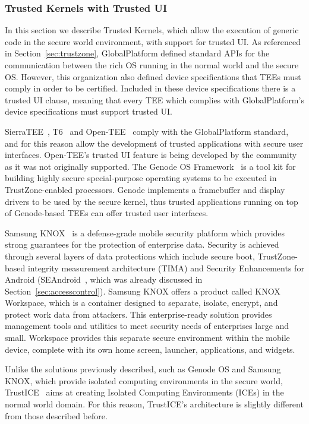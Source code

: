 \subsubsection{Trusted Kernels with Trusted UI}

In this section we describe Trusted Kernels, which allow the execution of generic code in the secure world environment, with support for trusted UI. As referenced in Section~\ref{sec:trustzone}, GlobalPlatform defined standard APIs for the communication between the rich OS running in the normal world and the secure OS. However, this organization also defined device specifications that TEEs must comply in order to be certified. Included in these device specifications there is a trusted UI clause, meaning that every TEE which complies with GlobalPlatform's device specifications must support trusted UI. 

SierraTEE~\cite{sierra_tee}, T6~\cite{t6_tee} and Open-TEE~\cite{mcgillion2015open} comply with the GlobalPlatform standard, and for this reason allow the development of trusted applications with secure user interfaces. Open-TEE's trusted UI feature is being developed by the community as it was not originally supported. The Genode OS Framework~\cite{genode} is a tool kit for building highly secure special-purpose operating systems to be executed in TrustZone-enabled processors. Genode implements a framebuffer and display drivers to be used by the secure kernel, thus trusted applications running on top of Genode-based TEEs can offer trusted user interfaces.

Samsung KNOX~\cite{knox_whitepaper} is a defense-grade mobile security platform which provides strong guarantees for the protection of enterprise data. Security is achieved through several layers of data protections which include secure boot, TrustZone-based integrity measurement architecture (TIMA) and Security Enhancements for Android (SEAndroid~\cite{smalley2013security}, which was already discussed in Section~\ref{sec:accesscontrol}). Samsung KNOX offers a product called KNOX Workspace, which is a container designed to separate, isolate, encrypt, and protect work data from attackers. This enterprise-ready solution provides management tools and utilities to meet security needs of enterprises large and small. Workspace provides this separate secure environment within the mobile device, complete with its own home screen, launcher, applications, and widgets.

Unlike the solutions previously described, such as Genode OS and Samsung KNOX, which provide isolated computing environments in the secure world, TrustICE~\cite{sun2015trustice} aims at creating Isolated Computing Environments (ICEs) in the normal world domain. For this reason, TrustICE's architecture is slightly different from those described before.

